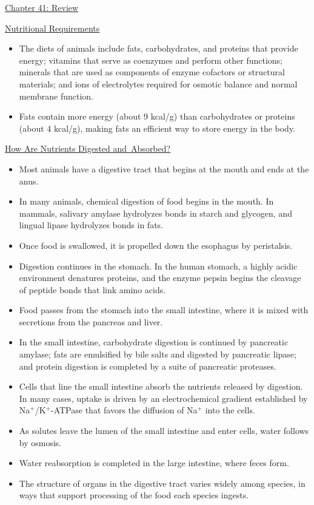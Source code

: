 \documentclass[12pt,letterpaper]{article}
\begin{document}
\hypertarget{41.r}{}
\begin{probbox}{\hyperlink{41}{Chapter 41: Review}}\end{probbox}
    \hyperlink{41.1}{Nutritional Requirements}
    \begin{itemize}
        \item The diets of animals include fats, carbohydrates, and proteins that provide energy; vitamins that serve as coenzymes and perform other functions; minerals that are used as components of enzyme cofactors or structural materials; and ions of electrolytes required for osmotic balance and normal membrane function. 
        \item Fats contain more energy (about 9 kcal/g) than carbohydrates or proteins (about 4 kcal/g), making fats an efficient way to store energy in the body.
    \end{itemize}
    \hyperlink{41.3}{How Are Nutrients Digested and Absorbed?}
    \begin{itemize}
        \item Most animals have a digestive tract that begins at the mouth and ends at the anus. 
        \item In many animals, chemical digestion of food begins in the mouth. In mammals, salivary amylase hydrolyzes bonds in starch and glycogen, and lingual lipase hydrolyzes bonds in fats. 
        \item Once food is swallowed, it is propelled down the esophagus by peristalsis. 
        \item Digestion continues in the stomach. In the human stomach, a highly acidic environment denatures proteins, and the enzyme pepsin begins the cleavage of peptide bonds that link amino acids. 
        \item Food passes from the stomach into the small intestine, where it is mixed with secretions from the pancreas and liver. 
        \item In the small intestine, carbohydrate digestion is continued by pancreatic amylase; fats are emulsified by bile salts and digested by pancreatic lipase; and protein digestion is completed by a suite of pancreatic proteases. 
        \item Cells that line the small intestine absorb the nutrients released by digestion. In many cases, uptake is driven by an electrochemical gradient established by Na\(^+\)/K\(^+\)-ATPase that favors the diffusion of Na\(^+\) into the cells. 
        \item As solutes leave the lumen of the small intestine and enter cells, water follows by osmosis. 
        \item Water reabsorption is completed in the large intestine, where feces form. 
        \item The structure of organs in the digestive tract varies widely among species, in ways that support processing of the food each species ingests.
    \end{itemize}
\end{document}
